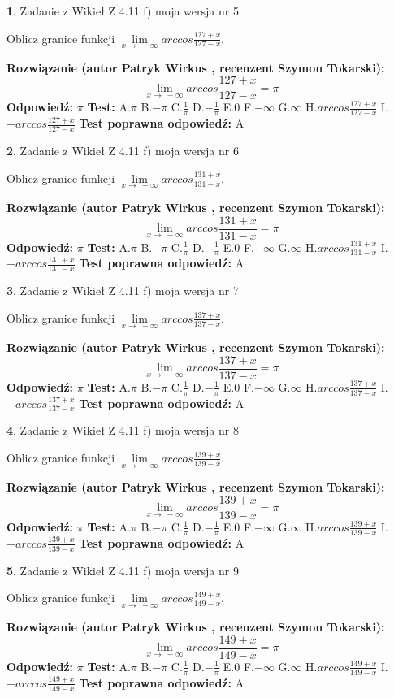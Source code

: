\documentclass[12pt, a4paper]{article}
\theoremstyle{definition} %
\newtheorem{zad}{}
\newcommand{\zadStart}[1]{\begin{zad}#1\newline}
\newcommand{\zadStop}{\end{zad}}
\newcommand{\rozwStart}[2]{\noindent \textbf{Rozwiązanie (autor #1 , recenzent #2): }\newline}
\newcommand{\rozwStop}{\newline}
\newcommand{\odpStart}{\noindent \textbf{Odpowiedź:}\newline}
\newcommand{\odpStop}{\newline}
\newcommand{\testStart}{\noindent \textbf{Test:}\newline}
\newcommand{\testStop}{\newline}
\newcommand{\kluczStart}{\noindent \textbf{Test poprawna odpowiedź:}\newline}
\newcommand{\kluczStop}{\newline}
\begin{document}
\zadStart{Zadanie z Wikieł Z 4.11 f) moja wersja nr 5}

Oblicz granice funkcji $\lim\limits_{x\to\ -\infty}arccos\frac{127+x}{127-x}$.
\zadStop
\rozwStart{Patryk Wirkus}{Szymon Tokarski}
$$\lim\limits_{x\to\ -\infty}arccos\frac{127+x}{127-x} = \pi$$
\rozwStop
\odpStart
$\pi$
\odpStop
\testStart
A.$\pi$ B.$-\pi$ C.$\frac{1}{\pi}$ D.$-\frac{1}{\pi}$ E.$0$ F.$-\infty$ G.$\infty$ H.$arccos\frac{127+x}{127-x}$ I.$-arccos\frac{127+x}{127-x}$
\testStop
\kluczStart
A
\kluczStop



\zadStart{Zadanie z Wikieł Z 4.11 f) moja wersja nr 6}

Oblicz granice funkcji $\lim\limits_{x\to\ -\infty}arccos\frac{131+x}{131-x}$.
\zadStop
\rozwStart{Patryk Wirkus}{Szymon Tokarski}
$$\lim\limits_{x\to\ -\infty}arccos\frac{131+x}{131-x} = \pi$$
\rozwStop
\odpStart
$\pi$
\odpStop
\testStart
A.$\pi$ B.$-\pi$ C.$\frac{1}{\pi}$ D.$-\frac{1}{\pi}$ E.$0$ F.$-\infty$ G.$\infty$ H.$arccos\frac{131+x}{131-x}$ I.$-arccos\frac{131+x}{131-x}$
\testStop
\kluczStart
A
\kluczStop



\zadStart{Zadanie z Wikieł Z 4.11 f) moja wersja nr 7}

Oblicz granice funkcji $\lim\limits_{x\to\ -\infty}arccos\frac{137+x}{137-x}$.
\zadStop
\rozwStart{Patryk Wirkus}{Szymon Tokarski}
$$\lim\limits_{x\to\ -\infty}arccos\frac{137+x}{137-x} = \pi$$
\rozwStop
\odpStart
$\pi$
\odpStop
\testStart
A.$\pi$ B.$-\pi$ C.$\frac{1}{\pi}$ D.$-\frac{1}{\pi}$ E.$0$ F.$-\infty$ G.$\infty$ H.$arccos\frac{137+x}{137-x}$ I.$-arccos\frac{137+x}{137-x}$
\testStop
\kluczStart
A
\kluczStop



\zadStart{Zadanie z Wikieł Z 4.11 f) moja wersja nr 8}

Oblicz granice funkcji $\lim\limits_{x\to\ -\infty}arccos\frac{139+x}{139-x}$.
\zadStop
\rozwStart{Patryk Wirkus}{Szymon Tokarski}
$$\lim\limits_{x\to\ -\infty}arccos\frac{139+x}{139-x} = \pi$$
\rozwStop
\odpStart
$\pi$
\odpStop
\testStart
A.$\pi$ B.$-\pi$ C.$\frac{1}{\pi}$ D.$-\frac{1}{\pi}$ E.$0$ F.$-\infty$ G.$\infty$ H.$arccos\frac{139+x}{139-x}$ I.$-arccos\frac{139+x}{139-x}$
\testStop
\kluczStart
A
\kluczStop



\zadStart{Zadanie z Wikieł Z 4.11 f) moja wersja nr 9}

Oblicz granice funkcji $\lim\limits_{x\to\ -\infty}arccos\frac{149+x}{149-x}$.
\zadStop
\rozwStart{Patryk Wirkus}{Szymon Tokarski}
$$\lim\limits_{x\to\ -\infty}arccos\frac{149+x}{149-x} = \pi$$
\rozwStop
\odpStart
$\pi$
\odpStop
\testStart
A.$\pi$ B.$-\pi$ C.$\frac{1}{\pi}$ D.$-\frac{1}{\pi}$ E.$0$ F.$-\infty$ G.$\infty$ H.$arccos\frac{149+x}{149-x}$ I.$-arccos\frac{149+x}{149-x}$
\testStop
\kluczStart
A
\kluczStop
\end{document}
